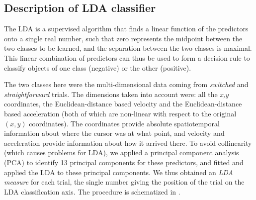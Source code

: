 \documentclass[11pt]{article}
\begin{document}
\subsection{Description of LDA classifier}
The LDA is a supervised algorithm that finds a linear function of the predictors onto a single real number, such that zero represents the midpoint between the two classes to be learned, and the separation between the two classes is maximal. This linear combination of predictors can thus be used to form a decision rule to classify objects of one class (negative) or the other (positive).
 
The two classes here were the multi-dimensional data coming from \emph{switched} and \emph{straightforward} trials. The dimensions taken into account were: all the \textit{x,y} coordinates, the Euclidean-distance based velocity and the Euclidean-distance based acceleration (both of which are non-linear with respect to the original $(x,y)$ coordinates). The coordinates provide absolute spatiotemporal information about where the cursor was at what point, and velocity and acceleration provide information about how it arrived there.
To avoid collinearity (which causes problems for LDA), we applied a principal component analysis (PCA) to identify 13 principal components for these predictors, and fitted and applied the LDA to these principal components.
We thus obtained an \emph{LDA measure} for each trial, the single number giving the position of the trial on the LDA classification axis.
The procedure is schematized in .
\end{document}
